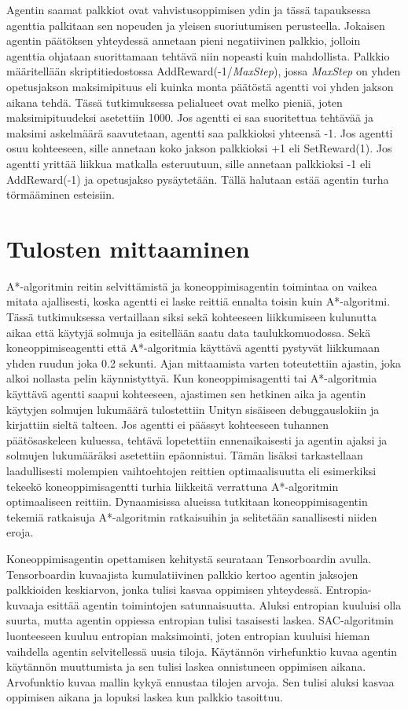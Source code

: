 \documentclass[utf8]{gradu3}
\begin{document}
Agentin saamat palkkiot ovat vahvistusoppimisen ydin ja tässä tapauksessa agenttia palkitaan sen nopeuden ja yleisen suoriutumisen perusteella. Jokaisen agentin päätöksen yhteydessä annetaan pieni negatiivinen palkkio, jolloin agenttia ohjataan suorittamaan tehtävä niin nopeasti kuin mahdollista. Palkkio määritellään skriptitiedostossa AddReward(-1/\textit{MaxStep}), jossa \textit{MaxStep} on yhden opetusjakson maksimipituus eli kuinka monta päätöstä agentti voi yhden jakson aikana tehdä. Tässä tutkimuksessa pelialueet ovat melko pieniä, joten maksimipituudeksi asetettiin 1000. Jos agentti ei saa suoritettua tehtävää ja maksimi askelmäärä saavutetaan, agentti saa palkkioksi yhteensä -1. Jos agentti osuu kohteeseen, sille annetaan koko jakson palkkioksi +1 eli SetReward(1). Jos agentti yrittää liikkua matkalla esteruutuun, sille annetaan palkkioksi -1 eli AddReward(-1) ja opetusjakso pysäytetään. Tällä halutaan estää agentin turha törmääminen esteisiin.

\section{Tulosten mittaaminen}
\label{sec:mittaaminen}

A*-algoritmin reitin selvittämistä ja koneoppimisagentin toimintaa on vaikea mitata ajallisesti, koska agentti ei laske reittiä ennalta toisin kuin A*-algoritmi. Tässä tutkimuksessa vertaillaan siksi sekä kohteeseen liikkumiseen kulunutta aikaa että käytyjä solmuja ja esitellään saatu data taulukkomuodossa. Sekä koneoppimiseagentti että A*-algoritmia käyttävä agentti pystyvät liikkumaan yhden ruudun joka 0.2 sekunti. Ajan mittaamista varten toteutettiin ajastin, joka alkoi nollasta pelin käynnistyttyä. Kun koneoppimisagentti tai A*-algoritmia käyttävä agentti saapui kohteeseen, ajastimen sen hetkinen aika ja agentin käytyjen solmujen lukumäärä tulostettiin Unityn sisäiseen debuggauslokiin ja kirjattiin sieltä talteen. Jos agentti ei päässyt kohteeseen tuhannen päätösaskeleen kuluessa, tehtävä lopetettiin ennenaikaisesti ja agentin ajaksi ja solmujen lukumääräksi asetettiin epäonnistui. Tämän lisäksi tarkastellaan laadullisesti molempien vaihtoehtojen reittien optimaalisuutta eli esimerkiksi tekeekö koneoppimisagentti turhia liikkeitä verrattuna A*-algoritmin optimaaliseen reittiin. Dynaamisissa alueissa tutkitaan koneoppimisagentin tekemiä ratkaisuja A*-algoritmin ratkaisuihin ja selitetään sanallisesti niiden eroja.

Koneoppimisagentin opettamisen kehitystä seurataan Tensorboardin avulla. Tensorboardin kuvaajista kumulatiivinen palkkio kertoo agentin jaksojen palkkioiden keskiarvon, jonka tulisi kasvaa oppimisen yhteydessä. Entropia-kuvaaja esittää agentin toimintojen satunnaisuutta. Aluksi entropian kuuluisi olla suurta, mutta agentin oppiessa entropian tulisi tasaisesti laskea. SAC-algoritmin luonteeseen kuuluu entropian maksimointi, joten entropian kuuluisi hieman vaihdella agentin selvitellessä uusia tiloja. Käytännön virhefunktio kuvaa agentin käytännön muuttumista ja sen tulisi laskea onnistuneen oppimisen aikana. Arvofunktio kuvaa mallin kykyä ennustaa tilojen arvoja. Sen tulisi aluksi kasvaa oppimisen aikana ja lopuksi laskea kun palkkio tasoittuu.
\end{document}
